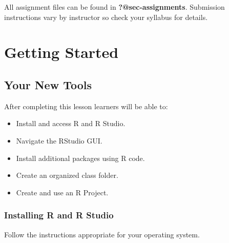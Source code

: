 \documentclass[
  letterpaper,
  DIV=11,
  numbers=noendperiod,
  oneside]{scrreprt}
\providecommand{\tightlist}{%
  \setlength{\itemsep}{0pt}\setlength{\parskip}{0pt}}\usepackage{longtable,booktabs,array}
\begin{document}

All assignment files can be found in \textbf{?@sec-assignments}.
Submission instructions vary by instructor so check your syllabus for
details.

\part{Getting Started}

\chapter{Your New Tools}\label{your-new-tools}

\begin{tcolorbox}[enhanced jigsaw, bottomrule=.15mm, colback=white, colframe=quarto-callout-note-color-frame, toprule=.15mm, coltitle=black, rightrule=.15mm, opacitybacktitle=0.6, colbacktitle=quarto-callout-note-color!10!white, toptitle=1mm, leftrule=.75mm, breakable, bottomtitle=1mm, titlerule=0mm, title=\textcolor{quarto-callout-note-color}{\faInfo}\hspace{0.5em}{Learning Objectives}, arc=.35mm, left=2mm, opacityback=0]

After completing this lesson learners will be able to:

\begin{itemize}
\tightlist
\item
  Install and access R and R Studio.
\item
  Navigate the RStudio GUI.
\item
  Install additional packages using R code.
\item
  Create an organized class folder.
\item
  Create and use an R Project.
\end{itemize}

\end{tcolorbox}

\section{Installing R and R Studio}\label{sec-install}

Follow the instructions appropriate for your operating system.
\end{document}
